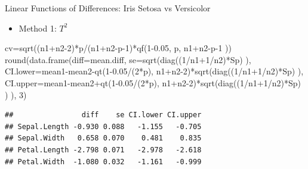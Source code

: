 \documentclass[
  ignorenonframetext,
]{beamer}
\newenvironment{Shaded}{\begin{snugshade}}{\end{snugshade}}
\newcommand{\AttributeTok}[1]{\textcolor[rgb]{0.77,0.63,0.00}{#1}}
\newcommand{\DecValTok}[1]{\textcolor[rgb]{0.00,0.00,0.81}{#1}}
\newcommand{\FloatTok}[1]{\textcolor[rgb]{0.00,0.00,0.81}{#1}}
\newcommand{\FunctionTok}[1]{\textcolor[rgb]{0.00,0.00,0.00}{#1}}
\newcommand{\NormalTok}[1]{#1}
\newcommand{\OtherTok}[1]{\textcolor[rgb]{0.56,0.35,0.01}{#1}}
\newcommand{\SpecialCharTok}[1]{\textcolor[rgb]{0.00,0.00,0.00}{#1}}
\providecommand{\tightlist}{%
  \setlength{\itemsep}{0pt}\setlength{\parskip}{0pt}}
\begin{document}
\begin{frame}[fragile]{Linear Functions of Differences: Iris Setosa vs
Versicolor}
\protect\hypertarget{linear-functions-of-differences-iris-setosa-vs-versicolor-2}{}
\begin{itemize}
\tightlist
\item
  Method 1: \(T^2\)
\end{itemize}

\tiny

\begin{Shaded}
\begin{Highlighting}[]
\NormalTok{cv}\OtherTok{=}\FunctionTok{sqrt}\NormalTok{((n1}\SpecialCharTok{+}\NormalTok{n2}\DecValTok{{-}2}\NormalTok{)}\SpecialCharTok{*}\NormalTok{p}\SpecialCharTok{/}\NormalTok{(n1}\SpecialCharTok{+}\NormalTok{n2}\SpecialCharTok{{-}}\NormalTok{p}\DecValTok{{-}1}\NormalTok{)}\SpecialCharTok{*}\FunctionTok{qf}\NormalTok{(}\DecValTok{1}\FloatTok{{-}0.05}\NormalTok{, p, n1}\SpecialCharTok{+}\NormalTok{n2}\SpecialCharTok{{-}}\NormalTok{p}\DecValTok{{-}1}\NormalTok{ ))}
\FunctionTok{round}\NormalTok{(}\FunctionTok{data.frame}\NormalTok{(}\AttributeTok{diff=}\NormalTok{mean.diff, }\AttributeTok{se=}\FunctionTok{sqrt}\NormalTok{(}\FunctionTok{diag}\NormalTok{((}\DecValTok{1}\SpecialCharTok{/}\NormalTok{n1}\SpecialCharTok{+}\DecValTok{1}\SpecialCharTok{/}\NormalTok{n2)}\SpecialCharTok{*}\NormalTok{Sp) ),}
\AttributeTok{CI.lower=}\NormalTok{mean1}\SpecialCharTok{{-}}\NormalTok{mean2}\SpecialCharTok{{-}}\FunctionTok{qt}\NormalTok{(}\DecValTok{1}\FloatTok{{-}0.05}\SpecialCharTok{/}\NormalTok{(}\DecValTok{2}\SpecialCharTok{*}\NormalTok{p), n1}\SpecialCharTok{+}\NormalTok{n2}\DecValTok{{-}2}\NormalTok{)}\SpecialCharTok{*}\FunctionTok{sqrt}\NormalTok{(}\FunctionTok{diag}\NormalTok{((}\DecValTok{1}\SpecialCharTok{/}\NormalTok{n1}\SpecialCharTok{+}\DecValTok{1}\SpecialCharTok{/}\NormalTok{n2)}\SpecialCharTok{*}\NormalTok{Sp) ),}
\AttributeTok{CI.upper=}\NormalTok{mean1}\SpecialCharTok{{-}}\NormalTok{mean2}\SpecialCharTok{+}\FunctionTok{qt}\NormalTok{(}\DecValTok{1}\FloatTok{{-}0.05}\SpecialCharTok{/}\NormalTok{(}\DecValTok{2}\SpecialCharTok{*}\NormalTok{p), n1}\SpecialCharTok{+}\NormalTok{n2}\DecValTok{{-}2}\NormalTok{)}\SpecialCharTok{*}\FunctionTok{sqrt}\NormalTok{(}\FunctionTok{diag}\NormalTok{((}\DecValTok{1}\SpecialCharTok{/}\NormalTok{n1}\SpecialCharTok{+}\DecValTok{1}\SpecialCharTok{/}\NormalTok{n2)}\SpecialCharTok{*}\NormalTok{Sp) ) ), }\DecValTok{3}\NormalTok{)}
\end{Highlighting}
\end{Shaded}

\begin{verbatim}
##                diff    se CI.lower CI.upper
## Sepal.Length -0.930 0.088   -1.155   -0.705
## Sepal.Width   0.658 0.070    0.481    0.835
## Petal.Length -2.798 0.071   -2.978   -2.618
## Petal.Width  -1.080 0.032   -1.161   -0.999
\end{verbatim}

\normalsize
\end{frame}
\end{document}
